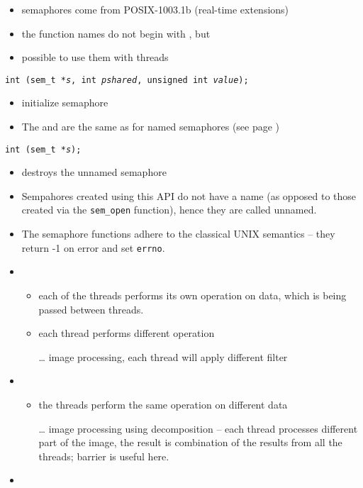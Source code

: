 \begin{slide}
\begin{itemize}
\item semaphores come from POSIX-1003.1b (real-time extensions)
\item the function names do not begin with , but 
\item possible to use them with threads
\end{itemize}
\texttt{int (sem\_t *\emph{s},
int \emph{pshared}, unsigned int \emph{value});}
\begin{itemize}
\item initialize semaphore
\item The  and  are the same as for named
semaphores (see page \pageref{NAMED_SEMAPHORES})
\end{itemize}
\texttt{int (sem\_t *\emph{s});}
\begin{itemize}
\item destroys the unnamed semaphore
\end{itemize}
\end{slide}

\begin{itemize}
\item Sempahores created using this API do not have a name (as opposed to
those created via the \texttt{sem\_open} function), hence they are called
unnamed.
\item The semaphore functions adhere to the classical UNIX semantics --
they return -1 on error and set \texttt{errno}.
\end{itemize}


\begin{slide}

\begin{itemize}
\item {}
\begin{itemize}
\item each of the threads performs its own operation on data,
which is being passed between threads.
\item each thread performs different operation
\item[\dots] image processing, each thread will apply different filter
\end{itemize}

\item {}
\begin{itemize}
\item the threads perform the same operation on different data
\item[\dots] image processing using decomposition -- each thread
processes different part of the image, the result is combination of
the results from all the threads; barrier is useful here.
\end{itemize}

\item {}
\end{itemize}
\end{slide}

